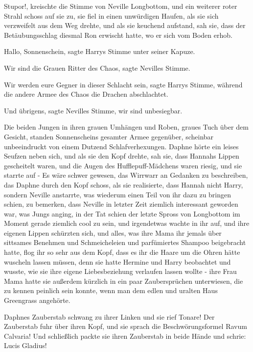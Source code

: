 \glqq{}Stupor!\grqq{}, kreischte die Stimme von Neville Longbottom, und ein
weiterer roter Strahl schoss auf sie zu, sie fiel in einen unwürdigen Haufen,
als sie sich verzweifelt aus dem Weg drehte, und als sie keuchend aufstand, sah
sie, dass der Betäubungsschlag diesmal Ron erwischt hatte, wo er sich vom Boden
erhob.

\glqq{}Hallo, Sonnenschein\grqq{}, sagte Harrys Stimme unter seiner Kapuze.

\glqq{}Wir sind die Grauen Ritter des Chaos\grqq{}, sagte Nevilles Stimme.

\glqq{}Wir werden eure Gegner in dieser Schlacht sein\grqq{}, sagte Harrys
Stimme, \glqq{}während die andere Armee des Chaos die Drachen
abschlachtet.\grqq{}

\glqq{}Und übrigens\grqq{}, sagte Nevilles Stimme, \glqq{}wir sind
unbesiegbar.\grqq{}

Die beiden Jungen in ihren grauen Umhängen und Roben, graues Tuch über dem
Gesicht, standen Sonnenscheins gesamter Armee gegenüber, scheinbar unbeeindruckt
von einem Dutzend Schlafverhexungen. Daphne hörte ein leises Seufzen neben sich,
und als sie den Kopf drehte, sah sie, dass Hannahs Lippen gescheitelt waren, und
die Augen des Hufflepuff-Mädchens waren riesig, und sie starrte auf - Es wäre
schwer gewesen, das Wirrwarr an Gedanken zu beschreiben, das Daphne durch den
Kopf schoss, als sie realisierte, dass Hannah nicht Harry, sondern Neville
anstarrte, was wiederum einen Teil von ihr dazu zu bringen schien, zu bemerken,
dass Neville in letzter Zeit ziemlich interessant geworden war, was Jungs
anging, in der Tat schien der letzte Spross von Longbottom im Moment gerade
ziemlich cool zu sein, und irgendetwas wachte in ihr auf, und ihre eigenen
Lippen schürzten sich, und alles, was ihre Mama ihr jemals über sittsames
Benehmen und Schmeicheleien und parfümiertes Shampoo beigebracht hatte, flog ihr
so sehr aus dem Kopf, dass es ihr die Haare um die Ohren hätte wuscheln lassen
müssen, denn sie hatte Hermine und Harry beobachtet und wusste, wie sie ihre
eigene Liebesbeziehung verlaufen lassen wollte - ihre Frau Mama hatte sie
außerdem kürzlich in ein paar Zaubersprüchen unterwiesen, die zu kennen peinlich
sein konnte, wenn man dem edlen und uralten Haus Greengrass angehörte.

Daphnes Zauberstab schwang zu ihrer Linken und sie rief \glqq{}Tonare!\grqq{} Der
Zauberstab fuhr über ihren Kopf, und sie sprach die Beschwörungsformel \glqq{}
Ravum Calvaria!\grqq{} Und schließlich packte sie ihren Zauberstab in beide
Hände und schrie: \glqq{}Lucis Gladius!\grqq{}

